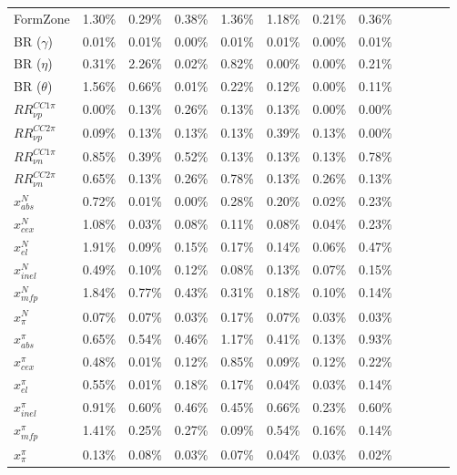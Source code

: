 \begin{table*}
\begin{tabular}{| l | l | l | l | l | l | l | l | l | l | l | l | }
FormZone  & 1.30\% &  0.29\% &  0.38\% &  1.36\% &  1.18\% &  0.21\% &  0.36\% \\
BR ($\gamma$) &0.01\% &  0.01\% &  0.00\% &  0.01\% &  0.01\% &  0.00\% &  0.01\%\\
BR ($\eta$) &0.31\% &  2.26\% &  0.02\% &  0.82\% &  0.00\% &  0.00\% &  0.21\% \\
BR ($\theta$) & 1.56\% &  0.66\% &  0.01\% &  0.22\% &  0.12\% &  0.00\% &  0.11\% \\ \hline

$RR_{\nu p}^{CC1\pi}$ & 0.00\% &  0.13\% &  0.26\% &  0.13\% &  0.13\% &  0.00\% &  0.00\%\\ 
$RR_{\nu p}^{CC2\pi}$ & 0.09\% &  0.13\% &  0.13\% &  0.13\% &  0.39\% &  0.13\% &  0.00\% \\
$RR_{\nu n}^{CC1\pi}$ & 0.85\% &  0.39\% &  0.52\% &  0.13\% &  0.13\% &  0.13\% &  0.78\%\\ 
$RR_{\nu n}^{CC2\pi}$ & 0.65\% &  0.13\% &  0.26\% &  0.78\% &  0.13\% &  0.26\% &  0.13\%  \\ \hline

$x_{abs}^{N}$ & 0.72\% &  0.01\% &  0.00\% &  0.28\% &  0.20\% &  0.02\% &  0.23\%\\
$x_{cex}^{N}$ &1.08\% &  0.03\% &  0.08\% &  0.11\% &  0.08\% &  0.04\% &  0.23\%\\
$x_{el}^{N}$ & 1.91\% &  0.09\% &  0.15\% &  0.17\% &  0.14\% &  0.06\% &  0.47\% \\
$x_{inel}^{N}$ & 0.49\% &  0.10\% &  0.12\% &  0.08\% &  0.13\% &  0.07\% &  0.15\% \\
$x_{mfp}^{N}$ & 1.84\% &  0.77\% &  0.43\% &  0.31\% &  0.18\% &  0.10\% &  0.14\%  \\
$x_{\pi}^{N}$ &0.07\% &  0.07\% &  0.03\% &  0.17\% &  0.07\% &  0.03\% &  0.03\%  \\
$x_{abs}^{\pi}$ &0.65\% &  0.54\% &  0.46\% &  1.17\% &  0.41\% &  0.13\% &  0.93\% \\
$x_{cex}^{\pi}$ & 0.48\% &  0.01\% &  0.12\% &  0.85\% &  0.09\% &  0.12\% &  0.22\% \\
$x_{el}^{\pi}$ &0.55\% &  0.01\% &  0.18\% &  0.17\% &  0.04\% &  0.03\% &  0.14\%\\
$x_{inel}^{\pi}$ & 0.91\% &  0.60\% &  0.46\% &  0.45\% &  0.66\% &  0.23\% &  0.60\%  \\
$x_{mfp}^{\pi}$ & 1.41\% &  0.25\% &  0.27\% &  0.09\% &  0.54\% &  0.16\% &  0.14\%  \\
$x_{\pi}^{\pi}$ &0.13\% &  0.08\% &  0.03\% &  0.07\% &  0.04\% &  0.03\% &  0.02\%\\
\hline
\end{tabular}
\end{table*}

